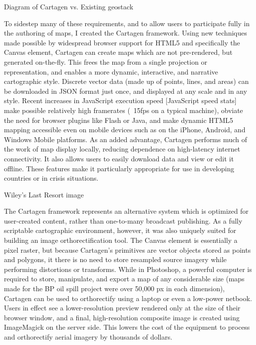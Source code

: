 \documentclass[11pt]{report}
\begin{document}
Diagram of Cartagen vs. Existing geostack

To sidestep many of these requirements, and to allow users to participate fully in the authoring of maps, I created the Cartagen framework. Using new techniques made possible by widespread browser support for HTML5 and specifically the Canvas element, Cartagen can create maps which are not pre-rendered, but generated on-the-fly. This frees the map from a single projection or representation, and enables a more dynamic, interactive, and narrative cartographic style. Discrete vector data (made up of points, lines, and areas) can be downloaded in JSON format just once, and displayed at any scale and in any style. Recent increases in JavaScript execution speed [JavaScript speed stats] make possible relatively high framerates (~15fps on a typical machine), obviate the need for browser plugins like Flash or Java, and make dynamic HTML5 mapping accessible even on mobile devices such as on the iPhone, Android, and Windows Mobile platforms. As an added advantage, Cartagen performs much of the work of map display locally, reducing dependence on high-latency internet connectivity. It also allows users to easily download data and view or edit it offline. These features make it particularly appropriate for use in developing countries or in crisis situations. 

Wiley's Last Resort image

The Cartagen framework represents an alternative system which is optimized for user-created content, rather than one-to-many broadcast publishing. As a fully scriptable cartographic environment, however, it was also uniquely suited for building an image orthorectification tool. The Canvas element is essentially a pixel raster, but because Cartagen's primitives are vector objects stored as points and polygons, it there is no need to store resampled source imagery while performing distortions or transforms. While in Photoshop, a powerful computer is required to store, manipulate, and export a map of any considerable size (maps made for the BP oil spill project were over 50,000 px in each dimension), Cartagen can be used to orthorectify using a laptop or even a low-power netbook. Users in effect see a lower-resolution preview rendered only at the size of their browser window, and a final, high-resolution composite image is created using ImageMagick on the server side. This lowers the cost of the equipment to process and orthorectify aerial imagery by thousands of dollars. 

\end{document}
